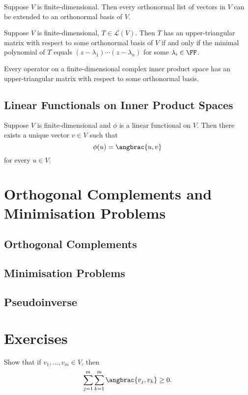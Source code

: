 \begin{corollary}
Suppose $V$ is finite-dimensional. Then every orthonormal list of vectors in $V$ can be extended to an orthonormal basis of $V$.
\end{corollary}

\begin{proposition}
Suppose $V$ is finite-dimensional, $T\in\mathcal{L}(V)$. Then $T$ has an upper-triangular matrix with respect to some orthonormal basis of $V$ if and only if the minimal polynomial of $T$ equals $(z-\lambda_1)\cdots(z-\lambda_n)$ for some $\lambda_i\in\FF$.
\end{proposition}

\begin{theorem}
Every operator on a finite-dimensional complex inner product space has an upper-triangular matrix with respect to some orthonormal basis.
\end{theorem}

\subsection{Linear Functionals on Inner Product Spaces}
\begin{theorem}
Suppose $V$ is finite-dimensional and $\phi$ is a linear functional on $V$. Then there exists a unique vector $v\in V$ such that
\[\phi(u)=\angbrac{u,v}\]
for every $u\in V$.
\end{theorem}
\pagebreak

\section{Orthogonal Complements and Minimisation Problems}
\subsection{Orthogonal Complements}
\subsection{Minimisation Problems}
\subsection{Pseudoinverse}

\pagebreak

\section*{Exercises}
\begin{exercise}
Show that if $v_1,\dots,v_m\in V$, then
\[\sum_{j=1}^{m}\sum_{k=1}^{m}\angbrac{v_j,v_k}\ge0.\]
\end{exercise}

